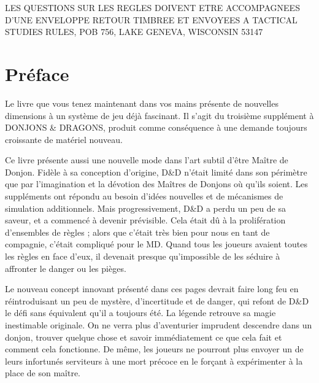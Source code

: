 \documentclass[11pt]{article}
\begin{document}
\vfill

{\small \noindent LES QUESTIONS SUR LES REGLES DOIVENT ETRE ACCOMPAGNEES D'UNE ENVELOPPE RETOUR TIMBREE ET ENVOYEES A TACTICAL STUDIES RULES, POB 756, LAKE GENEVA, WISCONSIN 53147}


\newpage
\phantom{-}

\vfill


\newpage

\section*{Préface}

Le livre que vous tenez maintenant dans vos mains présente de nouvelles dimensions à un système de jeu déjà fascinant. Il s'agit du troisième supplément à DONJONS \& DRAGONS, produit comme conséquence à une demande toujours croissante de matériel nouveau.

Ce livre présente aussi une nouvelle mode dans l'art subtil d'être Maître de Donjon. Fidèle à sa conception d'origine, D\&D n'était limité dans son périmètre que par l'imagination et la dévotion des Maîtres de Donjons où qu'ils soient. Les suppléments ont répondu au besoin d'idées nouvelles et de mécanismes de simulation additionnels. Mais progressivement, D\&D a perdu un peu de sa saveur, et a commencé à devenir prévisible. Cela était dû à la prolifération d'ensembles de règles ; alors que c'était très bien pour nous en tant de compagnie, c'était compliqué pour le MD. Quand tous les joueurs avaient toutes les règles en face d'eux, il devenait presque qu'impossible de les séduire à affronter le danger ou les pièges.

Le nouveau concept innovant présenté dans ces pages devrait faire long feu en réintroduisant un peu de mystère, d'incertitude et de danger, qui refont de D\&D le défi sans équivalent qu'il a toujours été. La légende retrouve sa magie inestimable originale. On ne verra plus d'aventurier imprudent descendre dans un donjon, trouver quelque chose et savoir immédiatement ce que cela fait et comment cela fonctionne. De même, les joueurs ne pourront plus envoyer un de leurs infortunés serviteurs à une mort précoce en le forçant à expérimenter à la place de son maître.
\end{document}
